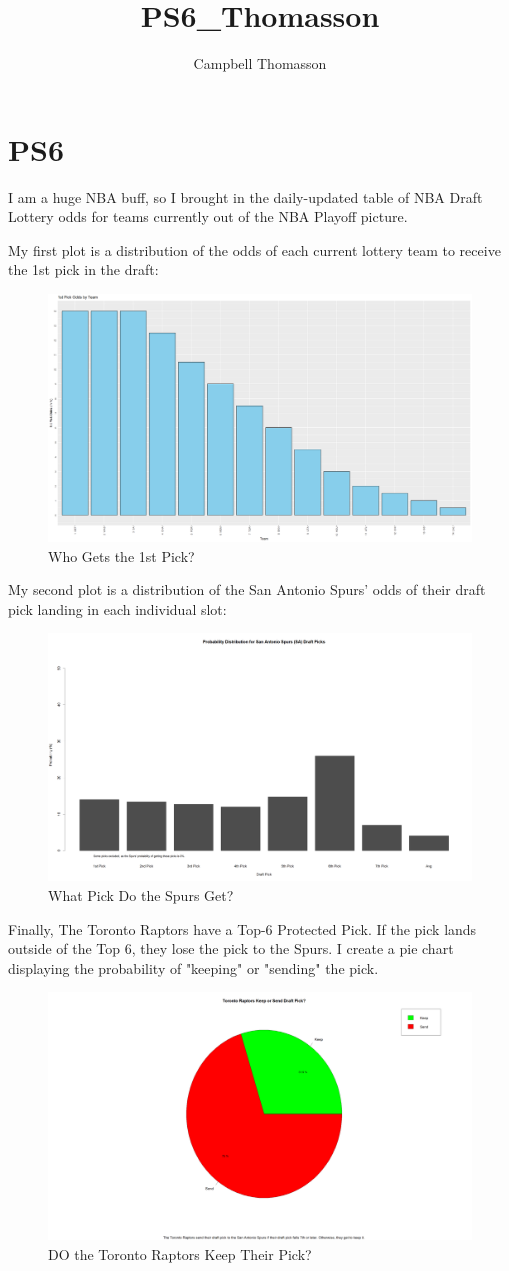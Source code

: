 \documentclass{article}
\title{PS6_Thomasson}
\author{Campbell Thomasson}
\begin{document}
\maketitle

\section{PS6}

I am a huge NBA buff, so I brought in the daily-updated table of NBA Draft Lottery odds for teams currently out of the NBA Playoff picture. 

My first plot is a distribution of the odds of each current lottery team to receive the 1st pick in the draft:

\begin{figure}
    \centering
    \includegraphics[width=0.5\linewidth]{PS6a_Thomasson.png}
    \caption{Who Gets the 1st Pick?}
    \label{fig:enter-label}
\end{figure}

My second plot is a distribution of the San Antonio Spurs' odds of their draft pick landing in each individual slot:

\begin{figure}
    \centering
    \includegraphics[width=0.5\linewidth]{PS6b_Thomasson.png}
    \caption{What Pick Do the Spurs Get?}
    \label{fig:enter-label}
\end{figure}

Finally, The Toronto Raptors have a Top-6 Protected Pick. If the pick lands outside of the Top 6, they lose the pick to the Spurs. I create a pie chart displaying the probability of "keeping" or "sending" the pick.

\begin{figure}
    \centering
    \includegraphics[width=0.5\linewidth]{PS6c_Thomasson.png}
    \caption{DO the Toronto Raptors Keep Their Pick?}
    \label{fig:enter-label}
\end{figure}
\end{document}
